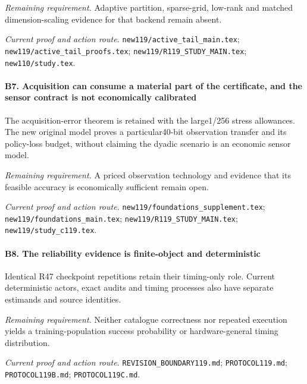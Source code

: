\par\emph{Remaining requirement.} Adaptive partition, sparse-grid, low-rank and matched dimension-scaling evidence for that backend remain absent.

\par\emph{Current proof and action route.} \nolinkurl{new119/active_tail_main.tex}; \nolinkurl{new119/active_tail_proofs.tex}; \nolinkurl{new119/R119_STUDY_MAIN.tex}; \nolinkurl{new110/study.tex}.

\paragraph{B7. Acquisition can consume a material part of the certificate, and the sensor contract is not economically calibrated}

The acquisition-error theorem is retained with the large1/256 stress allowances. The new original model proves a particular40-bit observation transfer and its policy-loss budget, without claiming the dyadic scenario is an economic sensor model.

\par\emph{Remaining requirement.} A priced observation technology and evidence that its feasible accuracy is economically sufficient remain open.

\par\emph{Current proof and action route.} \nolinkurl{new119/foundations_supplement.tex}; \nolinkurl{new119/foundations_main.tex}; \nolinkurl{new119/R119_STUDY_MAIN.tex}; \nolinkurl{new119/study_c119.tex}.

\paragraph{B8. The reliability evidence is finite-object and deterministic}

Identical R47 checkpoint repetitions retain their timing-only role. Current deterministic actors, exact audits and timing processes also have separate estimands and source identities.

\par\emph{Remaining requirement.} Neither catalogue correctness nor repeated execution yields a training-population success probability or hardware-general timing distribution.

\par\emph{Current proof and action route.} \nolinkurl{REVISION_BOUNDARY119.md}; \nolinkurl{PROTOCOL119.md}; \nolinkurl{PROTOCOL119B.md}; \nolinkurl{PROTOCOL119C.md}.


